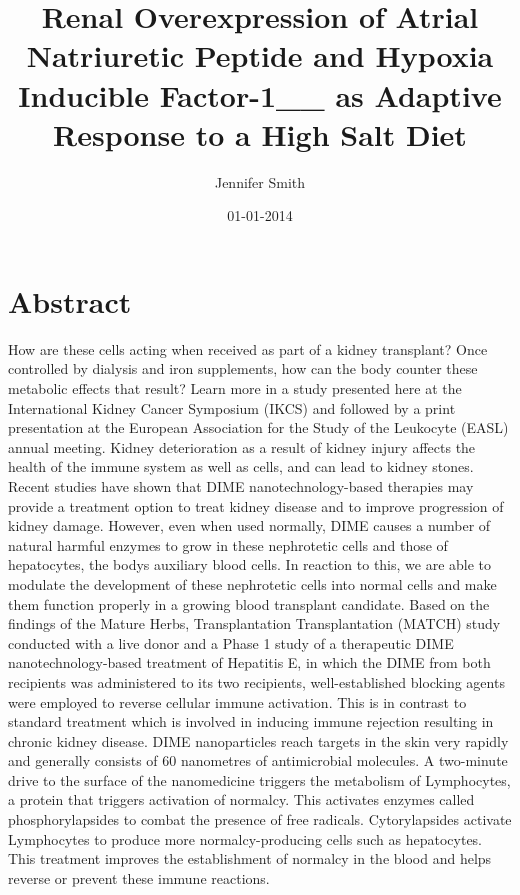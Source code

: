 \documentclass{article}%
\title{Renal Overexpression of Atrial Natriuretic Peptide and Hypoxia Inducible Factor{-}1\_\_ as Adaptive Response to a High Salt Diet}%
\author{Jennifer Smith}%
\affil{Department of Pharmacology, National Medicines Institute, Warsaw, Poland}%
\date{01{-}01{-}2014}%
\begin{document}
%
\normalsize%
\maketitle%
\section{Abstract}%
\label{sec:Abstract}%
How are these cells acting when received as part of a kidney transplant? Once controlled by dialysis and iron supplements, how can the body counter these metabolic effects that result? Learn more in a study presented here at the International Kidney Cancer Symposium (IKCS) and followed by a print presentation at the European Association for the Study of the Leukocyte (EASL) annual meeting.\newline%
Kidney deterioration as a result of kidney injury affects the health of the immune system as well as cells, and can lead to kidney stones. Recent studies have shown that DIME nanotechnology{-}based therapies may provide a treatment option to treat kidney disease and to improve progression of kidney damage. However, even when used normally, DIME causes a number of natural harmful enzymes to grow in these nephrotetic cells and those of hepatocytes, the bodys auxiliary blood cells. In reaction to this, we are able to modulate the development of these nephrotetic cells into normal cells and make them function properly in a growing blood transplant candidate.\newline%
Based on the findings of the Mature Herbs, Transplantation Transplantation (MATCH) study conducted with a live donor and a Phase 1 study of a therapeutic DIME nanotechnology{-}based treatment of Hepatitis E, in which the DIME from both recipients was administered to its two recipients, well{-}established blocking agents were employed to reverse cellular immune activation. This is in contrast to standard treatment which is involved in inducing immune rejection resulting in chronic kidney disease.\newline%
DIME nanoparticles reach targets in the skin very rapidly and generally consists of 60 nanometres of antimicrobial molecules. A two{-}minute drive to the surface of the nanomedicine triggers the metabolism of Lymphocytes, a protein that triggers activation of normalcy. This activates enzymes called phosphorylapsides to combat the presence of free radicals. Cytorylapsides activate Lymphocytes to produce more normalcy{-}producing cells such as hepatocytes. This treatment improves the establishment of normalcy in the blood and helps reverse or prevent these immune reactions.\newline%
\end{document}
